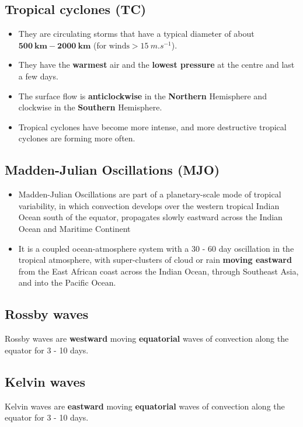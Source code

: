 \documentclass[11pt]{article}
\begin{document}
\subsection{Tropical cyclones (TC)}
\label{sec:orgd3bb4c8}
\begin{itemize}
\item They are circulating storms that have a typical diameter of about \(\mathbf{\qty{500}{km} - \qty{2000}{km}}\) (for \(\text{winds} > \qty{15}{m.s^{-1}}\)).
\item They have the \textbf{warmest} air and the \textbf{lowest pressure} at the centre and last a few days.
\item The surface flow is \textbf{anticlockwise} in the \textbf{Northern} Hemisphere and clockwise in the \textbf{Southern} Hemisphere.
\item Tropical cyclones have become more intense, and more destructive tropical cyclones are forming more often.
\end{itemize}

\newpage
\subsection{Madden-Julian Oscillations (MJO)}
\label{sec:org17ccea9}
\begin{itemize}
\item Madden-Julian Oscillations are part of a planetary-scale mode of tropical variability, in which convection develops over the western tropical Indian Ocean south of the equator, propagates slowly eastward across the Indian Ocean and Maritime Continent
\item It is a coupled ocean-atmosphere system with a 30 - 60 day oscillation in the tropical atmosphere, with super-clusters of cloud or rain \textbf{moving eastward} from the East African coast across the Indian Ocean, through Southeast Asia, and into the Pacific Ocean.
\end{itemize}
\subsection{Rossby waves}
\label{sec:orgb8b3ca3}
Rossby waves are \textbf{westward} moving \textbf{equatorial} waves of convection along the equator for 3 - 10 days.
\subsection{Kelvin waves}
\label{sec:org948b815}
Kelvin waves are \textbf{eastward} moving \textbf{equatorial} waves of convection along the equator for 3 - 10 days.
\end{document}
